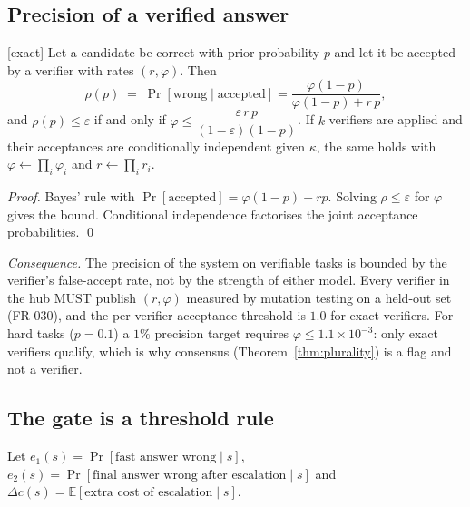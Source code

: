 \subsection{Precision of a verified answer}

\begin{theorem} \textnormal{[exact]}
\label{thm:precision}
Let a candidate be correct with prior probability $p$ and let it be accepted
by a verifier with rates $(r,\varphi)$. Then
\begin{equation}
\rho(p)\;=\;\Pr[\text{wrong}\mid\text{accepted}]
=\frac{\varphi(1-p)}{\varphi(1-p)+r\,p},
\end{equation}
and $\rho(p)\le\varepsilon$ if and only if
$\varphi\le\dfrac{\varepsilon\,r\,p}{(1-\varepsilon)(1-p)}$. If $k$ verifiers
are applied and their acceptances are conditionally independent given
$\kappa$, the same holds with $\varphi\leftarrow\prod_i\varphi_i$ and
$r\leftarrow\prod_i r_i$.
\end{theorem}
\begin{proof}
Bayes' rule with $\Pr[\text{accepted}]=\varphi(1-p)+rp$. Solving
$\rho\le\varepsilon$ for $\varphi$ gives the bound. Conditional independence
factorises the joint acceptance probabilities. \qed
\end{proof}
\emph{Consequence.} The precision of the system on verifiable tasks is
bounded by the verifier's false-accept rate, not by the strength of either
model. Every verifier in the hub MUST publish $(r,\varphi)$ measured by
mutation testing on a held-out set (FR-030), and the per-verifier acceptance
threshold is $1.0$ for exact verifiers. For hard tasks ($p=0.1$) a $1\%$
precision target requires $\varphi\le1.1\times10^{-3}$: only exact verifiers
qualify, which is why consensus (Theorem~\ref{thm:plurality}) is a flag and not
a verifier.

\subsection{The gate is a threshold rule}

Let $e_1(s)=\Pr[\text{fast answer wrong}\mid s]$,
$e_2(s)=\Pr[\text{final answer wrong after escalation}\mid s]$ and
$\Delta c(s)=\mathbb E[\text{extra cost of escalation}\mid s]$.


